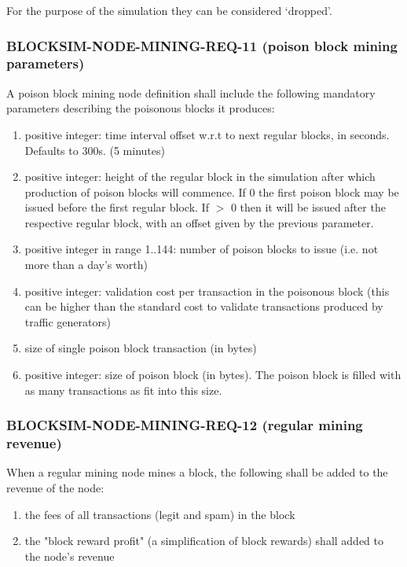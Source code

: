 \documentclass{scrreprt}
\begin{document}
        For the purpose of the simulation they can be considered `dropped'.

      \subsubsection{BLOCKSIM-NODE-MINING-REQ-11 (poison block mining parameters)}

        A poison block mining node definition shall include the following
        mandatory parameters describing the poisonous blocks it produces:

        \begin{enumerate}
          \item positive integer: time interval offset w.r.t to next regular
            blocks, in seconds.  Defaults to 300s.  (5 minutes)
          \item positive integer: height of the regular block in the simulation
            after which production of poison blocks will commence.
            If 0 the first poison block may be issued before the first regular block.
            If $>$ 0 then it will be issued after the respective regular block, with an offset
            given by the previous parameter.
          \item positive integer in range 1..144: number of poison blocks to
            issue (i.e. not more than a day's worth)
          \item positive integer: validation cost per transaction in the
            poisonous block (this can be higher than the standard cost to validate
            transactions produced by traffic generators)
          \item size of single poison block transaction (in bytes)
          \item positive integer: size of poison block (in bytes).
            The poison block is filled with as many transactions as fit into
            this size.
        \end{enumerate}

      \subsubsection{BLOCKSIM-NODE-MINING-REQ-12 (regular mining revenue)}

        When a regular mining node mines a block, the following shall be
        added to the revenue of the node:

        \begin{enumerate}
          \item the fees of all transactions (legit and spam) in the block
          \item the "block reward profit" (a simplification of
            block rewards) shall added to the node's revenue
        \end{enumerate}
\end{document}
